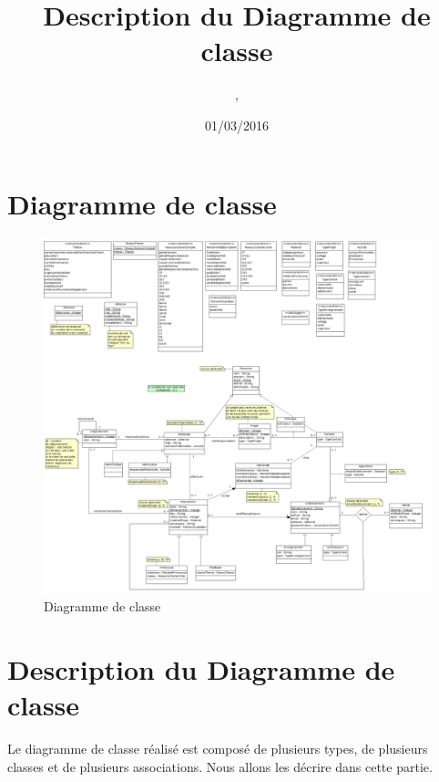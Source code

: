 \documentclass[asi, sansVersion]{picInsa}
\begin{document}
\title{Description du Diagramme de classe}
\author{\Mathieu, \Julie}
\date{01/03/2016} 

\maketitle

\tableofcontents

\chapter{Diagramme de classe}

\begin{landscape}
\begin{figure}
	\centering
	\includegraphics[scale=0.3]{images/Diagrammedeclasses}
	\caption{\label{modele}Diagramme de classe}
\end{figure}
\end{landscape}

\chapter{Description du Diagramme de classe}

Le diagramme de classe réalisé est composé de plusieurs types, de plusieurs classes et de plusieurs associations. Nous allons les décrire dans cette partie. \\ 
\end{document}
